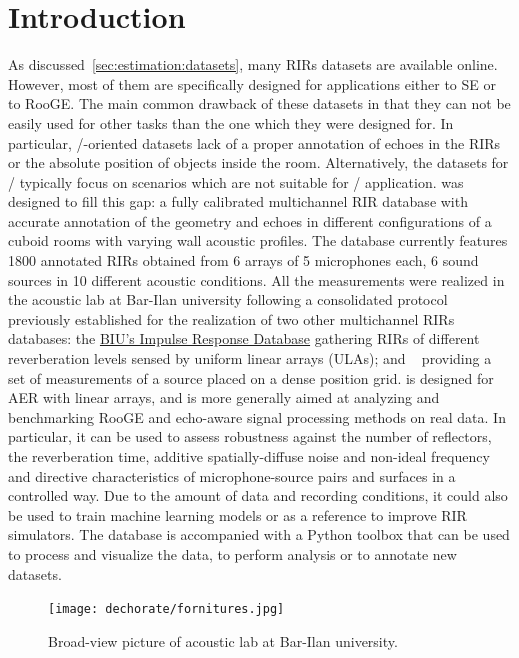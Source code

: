 \section{Introduction}\label{sec:dechorate:intro}
As discussed~\cref{sec:estimation:datasets}, many \acp{RIR} datasets are available online.
However, most of them are specifically designed for applications either to \acf{SE} or to \acf{RooGE}.
The main common drawback of these datasets in that they can not be easily used for other tasks than the one which they were designed for.
In particular, \SE/-oriented datasets lack of a proper annotation of echoes in the \acp{RIR} or the absolute position of objects inside the room.
Alternatively, the datasets for \RooGE/ typically focus on scenarios which are not suitable for \SE/ application.
\dEchorate{} was designed to fill this gap: a fully calibrated multichannel \ac{RIR} database with accurate annotation of the geometry and echoes in different configurations of a cuboid rooms with varying wall acoustic profiles.
The database currently features 1800 annotated \acp{RIR} obtained from 6 arrays of 5 microphones each, 6 sound sources in 10 different acoustic conditions.
All the measurements were realized in the acoustic lab at Bar-Ilan university following a consolidated protocol previously established for the realization of two other multichannel \acp{RIR} databases:
the \href{http://www.eng.biu.ac.il/~gannot/RIR_DATABASE/}{BIU's Impulse Response Database\ExternalLink}  gathering \acp{RIR} of different reverberation levels sensed by uniform linear arrays (ULAs);
and \href{https://asap.ite.tul.cz/downloads/MIRaGe/}{\ExternalLink}~ providing a set of measurements of a source placed on a dense position grid.
\dEchorate{} is designed for \acf{AER} with linear arrays, and is more generally aimed at analyzing and benchmarking RooGE and echo-aware signal processing methods on real data.
In particular, it can be used to assess robustness against the number of reflectors, the reverberation time, additive spatially-diffuse noise and non-ideal frequency and directive characteristics of microphone-source pairs and surfaces in a controlled way.
Due to the amount of data and recording conditions, it could also be used to train machine learning models or as a reference to improve \ac{RIR} simulators.
The database is accompanied with a Python toolbox that can be used to process and visualize the data, to perform analysis or to annotate new datasets.

\begin{figure}[t]
    \begin{fullwidth}
        \centering
        \texttt{[image: dechorate/fornitures.jpg]}
        \caption{Broad-view picture of acoustic lab at Bar-Ilan university.}
        \label{fig:dechorate:room}
    \end{fullwidth}
\end{figure}


